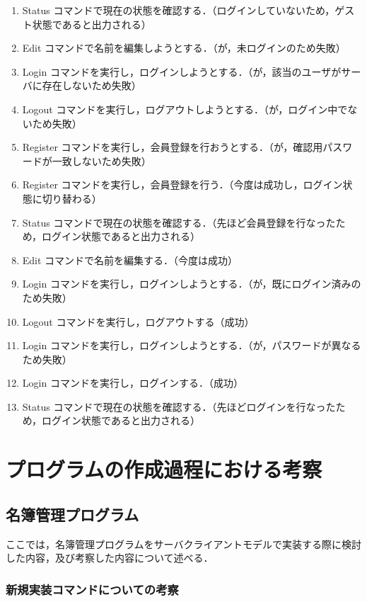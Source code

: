 \documentclass[11pt]{jsarticle}
\begin{document}
\begin{enumerate}
      \item Status コマンドで現在の状態を確認する．（ログインしていないため，ゲスト状態であると出力される）
      \item Edit コマンドで名前を編集しようとする．（が，未ログインのため失敗）
      \item Login コマンドを実行し，ログインしようとする．（が，該当のユーザがサーバに存在しないため失敗）
      \item Logout コマンドを実行し，ログアウトしようとする．（が，ログイン中でないため失敗）
      \item Register コマンドを実行し，会員登録を行おうとする．（が，確認用パスワードが一致しないため失敗）
      \item Register コマンドを実行し，会員登録を行う．（今度は成功し，ログイン状態に切り替わる）
      \item Status コマンドで現在の状態を確認する．（先ほど会員登録を行なったため，ログイン状態であると出力される）
      \item Edit コマンドで名前を編集する．（今度は成功）
      \item Login コマンドを実行し，ログインしようとする．（が，既にログイン済みのため失敗）
      \item Logout コマンドを実行し，ログアウトする（成功）
      \item Login コマンドを実行し，ログインしようとする．（が，パスワードが異なるため失敗）
      \item Login コマンドを実行し，ログインする．（成功）
      \item Status コマンドで現在の状態を確認する．（先ほどログインを行なったため，ログイン状態であると出力される）
\end{enumerate}


\section{プログラムの作成過程における考察}

\subsection{名簿管理プログラム}

ここでは，名簿管理プログラムをサーバクライアントモデルで実装する際に検討した内容，及び考察した内容について述べる．

\subsubsection{新規実装コマンドについての考察}
\end{document}
